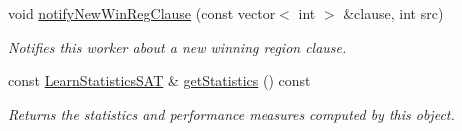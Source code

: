 \begin{DoxyCompactItemize}
void \hyperlink{classCounterGenSAT_a4938f8d5e2322e791bb26d8a5f6ebf04}{notify\-New\-Win\-Reg\-Clause} (const vector$<$ int $>$ \&clause, int src)
\begin{DoxyCompactList}\small\item\em Notifies this worker about a new winning region clause. \end{DoxyCompactList}\item 
const \hyperlink{classLearnStatisticsSAT}{Learn\-Statistics\-S\-A\-T} \& \hyperlink{classCounterGenSAT_aaa097494ceaf4670b20d90f6fa0f607d}{get\-Statistics} () const 
\begin{DoxyCompactList}\small\item\em Returns the statistics and performance measures computed by this object. \end{DoxyCompactList}\end{DoxyCompactItemize}
